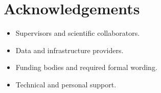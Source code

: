 \chapter*{Acknowledgements}

\begin{itemize}
  \item Supervisors and scientific collaborators.
  \item Data and infrastructure providers.
  \item Funding bodies and required formal wording.
  \item Technical and personal support.
\end{itemize}

\cleardoublepage
